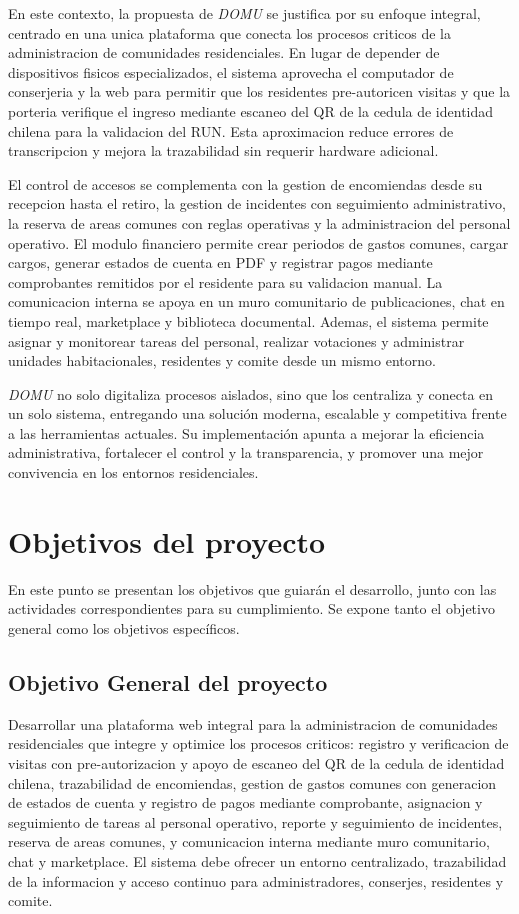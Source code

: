 En este contexto, la propuesta de \textit{DOMU} se justifica por su enfoque integral, centrado en una unica plataforma que conecta los procesos criticos de la administracion de comunidades residenciales. En lugar de depender de dispositivos fisicos especializados, el sistema aprovecha el computador de conserjeria y la web para permitir que los residentes pre-autoricen visitas y que la porteria verifique el ingreso mediante escaneo del QR de la cedula de identidad chilena para la validacion del RUN. Esta aproximacion reduce errores de transcripcion y mejora la trazabilidad sin requerir hardware adicional.

El control de accesos se complementa con la gestion de encomiendas desde su recepcion hasta el retiro, la gestion de incidentes con seguimiento administrativo, la reserva de areas comunes con reglas operativas y la administracion del personal operativo. El modulo financiero permite crear periodos de gastos comunes, cargar cargos, generar estados de cuenta en PDF y registrar pagos mediante comprobantes remitidos por el residente para su validacion manual. La comunicacion interna se apoya en un muro comunitario de publicaciones, chat en tiempo real, marketplace y biblioteca documental. Ademas, el sistema permite asignar y monitorear tareas del personal, realizar votaciones y administrar unidades habitacionales, residentes y comite desde un mismo entorno.

\textit{DOMU} no solo digitaliza procesos aislados, sino que los centraliza y conecta en un solo sistema, entregando una solución moderna, escalable y competitiva frente a las herramientas actuales. Su implementación apunta a mejorar la eficiencia administrativa, fortalecer el control y la transparencia, y promover una mejor convivencia en los entornos residenciales.

\section{Objetivos del proyecto}

En este punto se presentan los objetivos que guiarán el desarrollo, junto con las actividades correspondientes para su cumplimiento. Se expone tanto el objetivo general como los objetivos específicos.

\subsection{Objetivo General del proyecto}

Desarrollar una plataforma web integral para la administracion de comunidades residenciales que integre y optimice los procesos criticos: registro y verificacion de visitas con pre-autorizacion y apoyo de escaneo del QR de la cedula de identidad chilena, trazabilidad de encomiendas, gestion de gastos comunes con generacion de estados de cuenta y registro de pagos mediante comprobante, asignacion y seguimiento de tareas al personal operativo, reporte y seguimiento de incidentes, reserva de areas comunes, y comunicacion interna mediante muro comunitario, chat y marketplace. El sistema debe ofrecer un entorno centralizado, trazabilidad de la informacion y acceso continuo para administradores, conserjes, residentes y comite.


